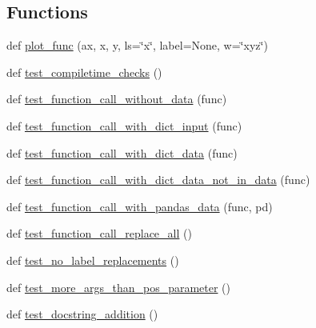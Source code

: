 \subsection*{Functions}
\begin{DoxyCompactItemize}
\item 
def \hyperlink{namespacematplotlib_1_1tests_1_1test__preprocess__data_a0f308fb2c318c63c0311948f62c08dca}{plot\+\_\+func} (ax, x, y, ls=\char`\"{}x\char`\"{}, label=None, w=\char`\"{}xyz\char`\"{})
\item 
def \hyperlink{namespacematplotlib_1_1tests_1_1test__preprocess__data_ac93506ea48129e2b4ba2fafe724587ec}{test\+\_\+compiletime\+\_\+checks} ()
\item 
def \hyperlink{namespacematplotlib_1_1tests_1_1test__preprocess__data_af99f6da915fdcaaa378c8c18554e0e4e}{test\+\_\+function\+\_\+call\+\_\+without\+\_\+data} (func)
\item 
def \hyperlink{namespacematplotlib_1_1tests_1_1test__preprocess__data_adce2b6a0b2e1cdfaa5f6341b4f8d3e3d}{test\+\_\+function\+\_\+call\+\_\+with\+\_\+dict\+\_\+input} (func)
\item 
def \hyperlink{namespacematplotlib_1_1tests_1_1test__preprocess__data_a9ea917c9539d52a94f67905db490727c}{test\+\_\+function\+\_\+call\+\_\+with\+\_\+dict\+\_\+data} (func)
\item 
def \hyperlink{namespacematplotlib_1_1tests_1_1test__preprocess__data_a20d4a8bd4cb1458c3a2c9b89057c4707}{test\+\_\+function\+\_\+call\+\_\+with\+\_\+dict\+\_\+data\+\_\+not\+\_\+in\+\_\+data} (func)
\item 
def \hyperlink{namespacematplotlib_1_1tests_1_1test__preprocess__data_ae464a68fcace13e00c5abb4c01359ee4}{test\+\_\+function\+\_\+call\+\_\+with\+\_\+pandas\+\_\+data} (func, pd)
\item 
def \hyperlink{namespacematplotlib_1_1tests_1_1test__preprocess__data_aeb4ba68d4bc0e18c1ed4a7d500cf9fa9}{test\+\_\+function\+\_\+call\+\_\+replace\+\_\+all} ()
\item 
def \hyperlink{namespacematplotlib_1_1tests_1_1test__preprocess__data_afc7506c4b2ca91748e8b86fac4a406e8}{test\+\_\+no\+\_\+label\+\_\+replacements} ()
\item 
def \hyperlink{namespacematplotlib_1_1tests_1_1test__preprocess__data_ac77759ef6a0d9b1ac355cc25d01eccae}{test\+\_\+more\+\_\+args\+\_\+than\+\_\+pos\+\_\+parameter} ()
\item 
def \hyperlink{namespacematplotlib_1_1tests_1_1test__preprocess__data_a5ce676cd64180cae3ce2a12f0b8d6466}{test\+\_\+docstring\+\_\+addition} ()
\end{DoxyCompactItemize}
